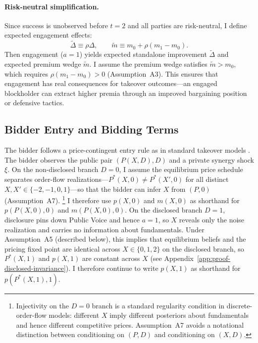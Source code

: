 \paragraph{Risk-neutral simplification.} Since success is unobserved before $t=2$ and all parties are risk-neutral, I define expected engagement effects:
\[
\tilde{\Delta} \equiv \rho \Delta, \qquad \tilde{m} \equiv m_0 + \rho(m_1 - m_0).
\]
Then engagement ($a=1$) yields expected standalone improvement $\tilde{\Delta}$ and expected premium wedge $\tilde{m}$. I assume the premium wedge satisfies $\tilde{m} > m_0$, which requires $\rho(m_1 - m_0) > 0$ (Assumption~A3). This ensures that engagement has real consequences for takeover outcomes---an engaged blockholder can extract higher premia through an improved bargaining position or defensive tactics.

\subsection{Bidder Entry and Bidding Terms}

The bidder follows a price-contingent entry rule as in standard takeover models \citep{GrossmanHart1980,Fishman1988,BulowHuangKlemperer1999,EdmansGoldsteinJiang2012}. The bidder observes the public pair $(P(X,D), D)$ and a private synergy shock $\xi$. On the non-disclosed branch $D=0$, I assume the equilibrium price schedule separates order-flow realizations---$P^*(X,0) \neq P^*(X',0)$ for all distinct $X, X' \in \{-2,-1,0,1\}$---so that the bidder can infer $X$ from $(P,0)$ (Assumption~A7).%
\footnote{Injectivity on the $D=0$ branch is a standard regularity condition in discrete-order-flow models: different $X$ imply different posteriors about fundamentals and hence different competitive prices. Assumption~A7 avoids a notational distinction between conditioning on $(P,D)$ and conditioning on $(X,D)$.}
I therefore use $p(X,0)$ and $m(X,0)$ as shorthand for $p(P(X,0),0)$ and $m(P(X,0),0)$. On the disclosed branch $D=1$, disclosure pins down Public Voice and hence $a=1$, so $X$ reveals only the noise realization and carries no information about fundamentals. Under Assumption~A5 (described below), this implies that equilibrium beliefs and the pricing fixed point are identical across $X\in\{0,1,2\}$ on the disclosed branch, so $P^*(X,1)$ and $p(X,1)$ are constant across $X$ (see Appendix~\ref{app:proof-disclosed-invariance}). I therefore continue to write $p(X,1)$ as shorthand for $p(P^*(X,1),1)$.

